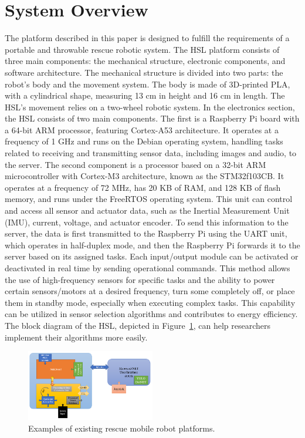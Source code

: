 \documentclass[conference]{IEEEtran}
\begin{document}
\section{System Overview}
The platform described in this paper is designed to fulfill the requirements of a portable and throwable rescue robotic system. The HSL platform consists of three main components: the mechanical structure, electronic components, and software architecture. The mechanical structure is divided into two parts: the robot's body and the movement system. The body is made of 3D-printed PLA, with a cylindrical shape, measuring 13 cm in height and 16 cm in length. The HSL's movement relies on a two-wheel robotic system. In the electronics section, the HSL consists of two main components. The first is a Raspberry Pi board with a 64-bit ARM processor, featuring Cortex-A53 architecture. It operates at a frequency of 1 GHz and runs on the Debian operating system, handling tasks related to receiving and transmitting sensor data, including images and audio, to the server. The second component is a processor based on a 32-bit ARM microcontroller with Cortex-M3 architecture, known as the STM32f103CB. It operates at a frequency of 72 MHz, has 20 KB of RAM, and 128 KB of flash memory, and runs under the FreeRTOS operating system. This unit can control and access all sensor and actuator data, such as the Inertial Measurement Unit (IMU), current, voltage, and actuator encoder. To send this information to the server, the data is first transmitted to the Raspberry Pi using the UART unit, which operates in half-duplex mode, and then the Raspberry Pi forwards it to the server based on its assigned tasks. Each input/output module can be activated or deactivated in real time by sending operational commands. This method allows the use of high-frequency sensors for specific tasks and the ability to power certain sensors/motors at a desired frequency, turn some completely off, or place them in standby mode, especially when executing complex tasks. This capability can be utilized in sensor selection algorithms and contributes to energy efficiency. The block diagram of the HSL, depicted in Figure~\ref{Fig_BlockDiagram}, can help researchers implement their algorithms more easily.

\begin{figure}[htbp] 
    \centerline{\includegraphics[width=0.5\textwidth]{BlockDiagram.PNG}} 
    \caption{Examples of existing rescue mobile robot platforms.} 
    \label{Fig_BlockDiagram}
\end{figure}
\end{document}
